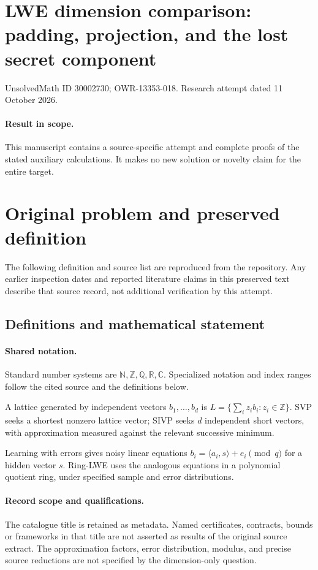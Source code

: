 \documentclass[11pt]{article}
\begin{document}
\section*{LWE dimension comparison: padding, projection, and the lost secret component}
\noindent UnsolvedMath ID 30002730; OWR-13353-018. Research attempt dated 11 October 2026.
\paragraph{Result in scope.}This manuscript contains a source-specific attempt and complete proofs of the stated auxiliary calculations. It makes no new solution or novelty claim for the entire target.
\section{Original problem and preserved definition}
The following definition and source list are reproduced from the repository. Any earlier inspection dates and reported literature claims in this preserved text describe that source record, not additional verification by this attempt.
\subsection{Definitions and mathematical statement}

\paragraph{Shared notation.}Standard number systems are $\mathbb N,\mathbb Z,\mathbb Q,\mathbb R,\mathbb C$. Specialized notation and index ranges follow the cited source and the definitions below.


A lattice generated by independent vectors $b_1,\ldots,b_d$ is $L=\{\sum_i z_i b_i:z_i\in\mathbb Z\}$. SVP seeks a shortest nonzero lattice vector; SIVP seeks $d$ independent short vectors, with approximation measured against the relevant successive minimum.

Learning with errors gives noisy linear equations $b_i=\langle a_i,s\rangle+e_i\pmod q$ for a hidden vector $s$. Ring-LWE uses the analogous equations in a polynomial quotient ring, under specified sample and error distributions.
\paragraph{Record scope and qualifications.}
The catalogue title is retained as metadata. Named certificates, contracts, bounds or frameworks in that title are not asserted as results of the original source extract.
The approximation factors, error distribution, modulus, and precise source reductions are not specified by the dimension-only question.
\end{document}
